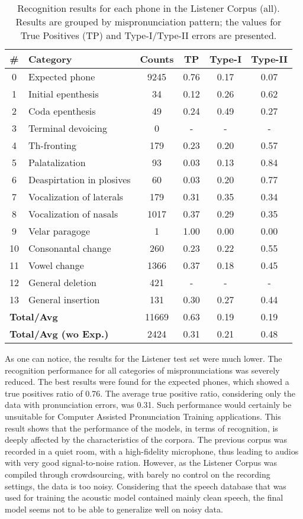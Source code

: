 \documentclass[twocolumn]{bmcart}%
\begin{document}
\setlength{\tabcolsep}{0.3em}
\scriptsize
\begin{table}[ht!]
\caption{Recognition results for each phone in the Listener Corpus (all). Results are grouped by mispronunciation pattern; the values for True Positives (TP) and Type-I/Type-II errors are presented.}
\begin{tabular}{clcccc} \hline
\textbf{\#} & \textbf{Category} & \textbf{Counts} & \textbf{TP} & \textbf{Type-I} & \textbf{Type-II} \\ \hline
0 & Expected phone & 9245 & 0.76 & 0.17 & 0.07 \\
1 & Initial epenthesis & 34 & 0.12 & 0.26 & 0.62 \\
2 & Coda epenthesis & 49 & 0.24 & 0.49 & 0.27 \\
3 & Terminal devoicing & 0 & - & - & - \\
4 & Th-fronting & 179 & 0.23 & 0.20 & 0.57 \\
5 & Palatalization & 93 & 0.03 & 0.13 & 0.84 \\
6 & Deaspirtation in plosives & 60 & 0.03 & 0.20 & 0.77 \\
7 & Vocalization of laterals & 179 & 0.31 & 0.35 & 0.34 \\
8 & Vocalization of nasals & 1017 & 0.37 & 0.29 & 0.35 \\
9 & Velar paragoge & 1 & 1.00 & 0.00 & 0.00 \\
10 & Consonantal change & 260 & 0.23 & 0.22 & 0.55 \\
11 & Vowel change & 1366 & 0.37 & 0.18 & 0.45 \\
12 & General deletion & 421 & - & - & - \\
13 & General insertion & 131 & 0.30 & 0.27 & 0.44 \\ \hline 
\multicolumn{2}{l}{\textbf{Total/Avg}} & 11669 & 0.63 & 0.19 & 0.19 \\ 
\multicolumn{2}{l}{\textbf{Total/Avg (wo Exp.)}} & 2424 & 0.31 & 0.21 & 0.48 \\ \hline
\end{tabular}
\label{rec-listener-all}
\end{table}

As one can notice, the results for the Listener test set were much lower. The recognition performance for all categories of mispronunciations was severely reduced. The best results were found for the expected phones, which showed a true positives ratio of 0.76. The average true positive ratio, considering only the data with pronunciation errors, was 0.31. Such performance would certainly be unsuitable for Computer Assisted Pronunciation Training applications. This result shows that the performance of the models, in terms of recognition, is deeply affected by the characteristics of the corpora. The previous corpus was recorded in a quiet room, with a high-fidelity microphone, thus leading to audios with very good signal-to-noise ration. However, as the Listener Corpus was compiled through crowdsourcing, with barely no control on the recording settings, the data is too noisy. Considering that the speech database that was used for training the acoustic model contained mainly clean speech, the final model seems not to be able to generalize well on noisy data.
\end{document}
